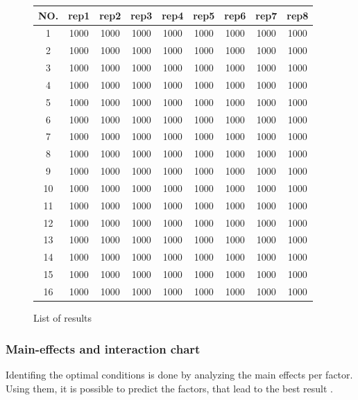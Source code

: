 \begin{figure}[H]
	\centering
	\begin{tabular}{ |c||c|c|c|c|c|c|c|c|  }
		\hline
		NO.& rep1 & rep2 & rep3 & rep4 & rep5 & rep6 & rep7 & rep8\\
		\hline
		1  & 1000 & 1000 & 1000 & 1000 & 1000 & 1000 & 1000 & 1000\\
		2  & 1000 & 1000 & 1000 & 1000 & 1000 & 1000 & 1000 & 1000\\
		3  & 1000 & 1000 & 1000 & 1000 & 1000 & 1000 & 1000 & 1000\\
		4  & 1000 & 1000 & 1000 & 1000 & 1000 & 1000 & 1000 & 1000\\
		5  & 1000 & 1000 & 1000 & 1000 & 1000 & 1000 & 1000 & 1000\\
		6  & 1000 & 1000 & 1000 & 1000 & 1000 & 1000 & 1000 & 1000\\
		7  & 1000 & 1000 & 1000 & 1000 & 1000 & 1000 & 1000 & 1000\\
		8  & 1000 & 1000 & 1000 & 1000 & 1000 & 1000 & 1000 & 1000\\
		9  & 1000 & 1000 & 1000 & 1000 & 1000 & 1000 & 1000 & 1000\\
		10 & 1000 & 1000 & 1000 & 1000 & 1000 & 1000 & 1000 & 1000\\
		11 & 1000 & 1000 & 1000 & 1000 & 1000 & 1000 & 1000 & 1000\\
		12 & 1000 & 1000 & 1000 & 1000 & 1000 & 1000 & 1000 & 1000\\
		13 & 1000 & 1000 & 1000 & 1000 & 1000 & 1000 & 1000 & 1000\\
		14 & 1000 & 1000 & 1000 & 1000 & 1000 & 1000 & 1000 & 1000\\
		15 & 1000 & 1000 & 1000 & 1000 & 1000 & 1000 & 1000 & 1000\\
		16 & 1000 & 1000 & 1000 & 1000 & 1000 & 1000 & 1000 & 1000\\
		\hline
	\end{tabular}
	\caption{List of results}
\end{figure}





\subsubsection{Main-effects and interaction chart}
Identifing the optimal conditions is done by analyzing the main effects per factor. Using them, it is possible to predict the factors, that lead to the best result \cite{roy_primer_1990}.


